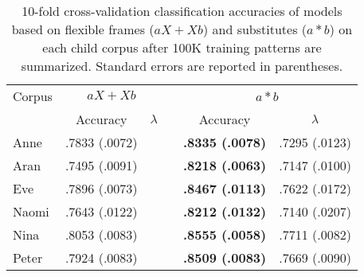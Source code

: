 \begin{table}[ht]
  \small
  \centering
  \caption{10-fold cross-validation classification accuracies of models based on
    flexible frames ($aX + Xb$) and substitutes ($a*b$) on each child corpus
    after 100K training patterns are summarized.  Standard errors are reported in
  parentheses.}
  \begin{tabular}{lccccc}
    \hline
    Corpus & \multicolumn{2}{c}{$aX+Xb$} && \multicolumn{2}{c}{$a*b$} \\
    \cline{2-3}
    \cline{5-6}
    & Accuracy & $\lambda$ && Accuracy & $\lambda$\\
    \hline
    Anne  & .7833 (.0072) &&& {\bf .8335 (.0078)} & .7295 (.0123)\\
    Aran  & .7495 (.0091) &&& {\bf .8218 (.0063)} & .7147 (.0100)\\
    Eve   & .7896 (.0073) &&& {\bf .8467 (.0113)} & .7622 (.0172)\\
    Naomi & .7643 (.0122) &&& {\bf .8212 (.0132)} & .7140 (.0207)\\
    Nina  & .8053 (.0083) &&& {\bf .8555 (.0058)} & .7711 (.0082)\\
    Peter & .7924 (.0083) &&& {\bf .8509 (.0083)} & .7669 (.0090)\\
    \hline
  \end{tabular}
  \label{t:framevssub100K}
\end{table}

